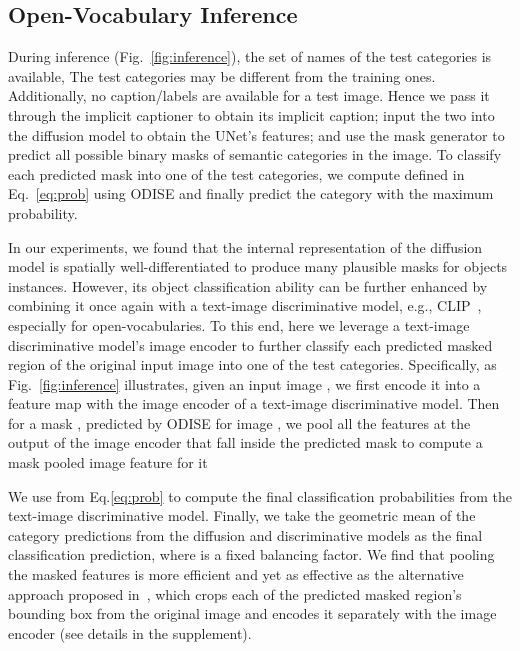 \documentclass[10pt,twocolumn,letterpaper]{article}
\newcommand{\ourmethod}{ODISE}
\begin{document}
\subsection{Open-Vocabulary Inference}
\label{sec:inference}

During inference (Fig.~\ref{fig:inference}), the set of names of the test categories  is available, The test categories may be different from the training ones.
Additionally, no caption/labels are available for a test image. 
Hence we pass it through the implicit captioner to obtain its implicit caption; input the two into the diffusion model to obtain the UNet's features; and use the mask generator to predict all possible binary masks of semantic categories in the image.
To classify each predicted mask  into one of the test categories, we compute  defined in Eq.~\ref{eq:prob} using \ourmethod{} and finally predict the category with the maximum probability. 

In our experiments, we found that the internal representation of the diffusion model is spatially well-differentiated to produce many plausible masks for objects instances. However, its object classification ability can be further enhanced by combining it once again with a text-image discriminative model, e.g., CLIP~\cite{radford2021clip}, especially for open-vocabularies.
To this end, here we leverage a text-image discriminative model's image encoder  to further classify each predicted masked region of the original input image into one of the test categories. 
Specifically, as Fig.~\ref{fig:inference} illustrates, given an input image , we first encode it into a feature map with the image encoder  of a text-image discriminative model. 
Then for a mask , predicted by \ourmethod{} for image , we pool all the features at the output of the image encoder  that fall inside the predicted mask  to compute a mask pooled image feature for it 

We use  from Eq.\ref{eq:prob} to compute the final classification probabilities from the text-image discriminative model. 
Finally, we take the geometric mean of the category predictions from the diffusion and discriminative models as the final classification prediction,
\vspace{-1em}
 where  is a fixed balancing factor.
We find that pooling the masked features is more efficient and yet as effective as the alternative approach proposed in~\cite{ding2022zegformer,gu2021vild}, which crops each of the  predicted masked region's bounding box from the original image and encodes it separately with the image encoder  (see details in the supplement).
\end{document}
